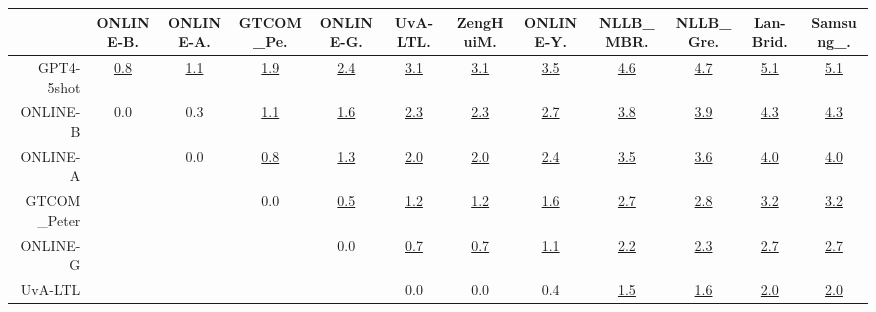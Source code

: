 \documentclass[11pt]{article}
\begin{document}
\begin{table}  
\scriptsize \begin{center}\begin{tabular}{rccccccccccc}
\toprule 
 & ONLINE-B. & ONLINE-A. & GTCOM\_Pe. & ONLINE-G. & UvA-LTL. & ZengHuiM. & ONLINE-Y. & NLLB\_MBR. & NLLB\_Gre. & Lan-Brid. & Samsung\_. \\ 
\midrule 
GPT4-5shot &  \cellcolor{red!70} \underline{0.8} & \cellcolor{red!70} \underline{1.1} & \cellcolor{red!70} \underline{1.9} & \cellcolor{red!70} \underline{2.4} & \cellcolor{red!70} \underline{3.1} & \cellcolor{red!70} \underline{3.1} & \cellcolor{red!70} \underline{3.5} & \cellcolor{red!70} \underline{4.6} & \cellcolor{red!70} \underline{4.7} & \cellcolor{red!70} \underline{5.1} & \cellcolor{red!70} \underline{5.1}\\ 
ONLINE-B &   \cellcolor{red!0} 0.0 & \cellcolor{red!60} 0.3 & \cellcolor{red!70} \underline{1.1} & \cellcolor{red!70} \underline{1.6} & \cellcolor{red!70} \underline{2.3} & \cellcolor{red!70} \underline{2.3} & \cellcolor{red!70} \underline{2.7} & \cellcolor{red!70} \underline{3.8} & \cellcolor{red!70} \underline{3.9} & \cellcolor{red!70} \underline{4.3} & \cellcolor{red!70} \underline{4.3}\\ 
ONLINE-A &  &   \cellcolor{red!0} 0.0 & \cellcolor{red!70} \underline{0.8} & \cellcolor{red!70} \underline{1.3} & \cellcolor{red!70} \underline{2.0} & \cellcolor{red!70} \underline{2.0} & \cellcolor{red!70} \underline{2.4} & \cellcolor{red!70} \underline{3.5} & \cellcolor{red!70} \underline{3.6} & \cellcolor{red!70} \underline{4.0} & \cellcolor{red!70} \underline{4.0}\\ 
GTCOM\_Peter &   &  & \cellcolor{red!0} 0.0 & \cellcolor{red!70} \underline{0.5} & \cellcolor{red!70} \underline{1.2} & \cellcolor{red!70} \underline{1.2} & \cellcolor{red!70} \underline{1.6} & \cellcolor{red!70} \underline{2.7} & \cellcolor{red!70} \underline{2.8} & \cellcolor{red!70} \underline{3.2} & \cellcolor{red!70} \underline{3.2}\\ 
ONLINE-G &  &  &  & \cellcolor{red!0} 0.0 & \cellcolor{red!70} \underline{0.7} & \cellcolor{red!70} \underline{0.7} & \cellcolor{red!70} \underline{1.1} & \cellcolor{red!70} \underline{2.2} & \cellcolor{red!70} \underline{2.3} & \cellcolor{red!70} \underline{2.7} & \cellcolor{red!70} \underline{2.7}\\ 
UvA-LTL &  &    &  &  & \cellcolor{red!0} 0.0 & \cellcolor{red!0} 0.0 & \cellcolor{red!0} 0.4 & \cellcolor{red!70} \underline{1.5} & \cellcolor{red!70} \underline{1.6} & \cellcolor{red!70} \underline{2.0} & \cellcolor{red!70} \underline{2.0}\\ 

\end{tabular}
\end{center}
\end{table}
\end{document}
